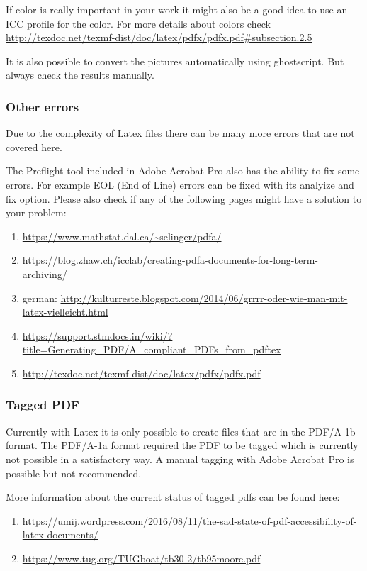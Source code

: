	If color is really important in your work it might also be a good idea to use an ICC profile for the color. 
	For more details about colors check \url{http://texdoc.net/texmf-dist/doc/latex/pdfx/pdfx.pdf#subsection.2.5}
	
	It is also possible to convert the pictures automatically using ghostscript. But always check the results manually. 
	
	\subsubsection{Other errors}
	Due to the complexity of Latex files there can be many more errors that are not covered here.
	
	The Preflight tool included in Adobe Acrobat Pro also has the ability to fix some errors. For example EOL (End of Line) errors can be fixed with its analyize and fix option. 
	Please also check if any of the following pages might have a solution to your problem:
	\begin{enumerate}
		\item \url{https://www.mathstat.dal.ca/~selinger/pdfa/}
		\item \url{https://blog.zhaw.ch/icclab/creating-pdfa-documents-for-long-term-archiving/}
		\item german: \url{http://kulturreste.blogspot.com/2014/06/grrrr-oder-wie-man-mit-latex-vielleicht.html}
		\item \url{https://support.stmdocs.in/wiki/?title=Generating_PDF/A_compliant_PDFs_from_pdftex}
		\item \url{http://texdoc.net/texmf-dist/doc/latex/pdfx/pdfx.pdf}
	\end{enumerate}
	
	\subsubsection{Tagged PDF}
	Currently with Latex it is only possible to create files that are in the PDF/A-1b format. The PDF/A-1a format required the PDF to be tagged which is currently not possible in a satisfactory way.
	A manual tagging with Adobe Acrobat Pro is possible but not recommended.
	
	More information about the current status of tagged pdfs can be found here:
	\begin{enumerate}
		\item \url{https://umij.wordpress.com/2016/08/11/the-sad-state-of-pdf-accessibility-of-latex-documents/} 
		\item \url{https://www.tug.org/TUGboat/tb30-2/tb95moore.pdf}
	\end{enumerate}
	
